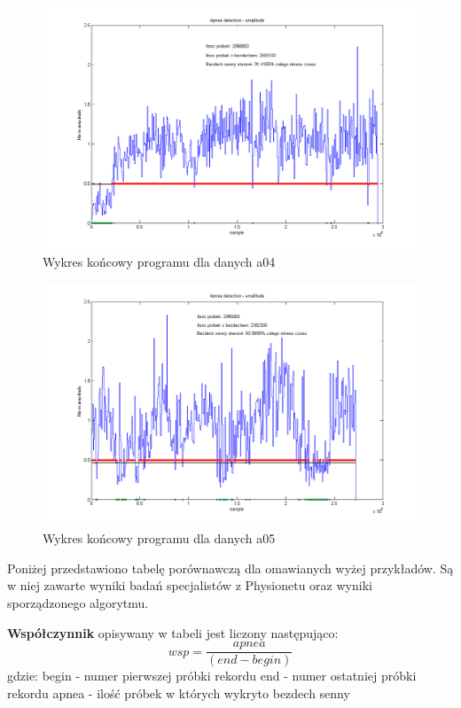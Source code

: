 \newpage
\begin{figure}[H]
\centering
\includegraphics[scale=0.7, angle=90]{SLEEP_APNEA/img/apnea4.png}
\caption{Wykres końcowy programu dla danych a04}
\label{fig:apnea_4}
\end{figure}
\newpage
\begin{figure}[H]
\centering
\includegraphics[scale=0.7, angle=90]{SLEEP_APNEA/img/apnea5.png}
\caption{Wykres końcowy programu dla danych a05}
\label{fig:apnea_5}
\end{figure} 
\newpage

Poniżej przedstawiono tabelę porównawczą dla omawianych wyżej przykładów. Są w niej zawarte wyniki badań specjalistów z Physionetu oraz wyniki sporządzonego algorytmu. 


\textbf{Współczynnik} opisywany w tabeli jest liczony następująco:
 \begin{equation}
 wsp =\frac{apnea}{ (end-begin)} 
 \end{equation}
gdzie: \newline
begin - numer pierwszej próbki rekordu \newline
end - numer ostatniej próbki rekordu \newline
apnea - ilość próbek w których wykryto bezdech senny \newline


